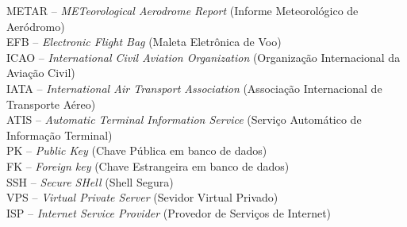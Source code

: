 \noindent \doublespacing
METAR -- \textit{METeorological Aerodrome Report} (Informe Meteorológico de Aeródromo)\\
EFB -- \textit{Electronic Flight Bag} (Maleta Eletrônica de Voo)\\
ICAO -- \textit{International Civil Aviation Organization} (Organização Internacional da Aviação Civil)\\
IATA -- \textit{International Air Transport Association} (Associação Internacional de Transporte Aéreo)\\
ATIS -- \textit{Automatic Terminal Information Service} (Serviço Automático de Informação Terminal)\\
PK -- \textit{Public Key} (Chave Pública em banco de dados)\\
FK -- \textit{Foreign key} (Chave Estrangeira em banco de dados)\\
SSH -- \textit{Secure SHell} (Shell Segura)\\
VPS -- \textit{Virtual Private Server} (Sevidor Virtual Privado)\\
ISP -- \textit{Internet Service Provider} (Provedor de Serviços de Internet)\\


